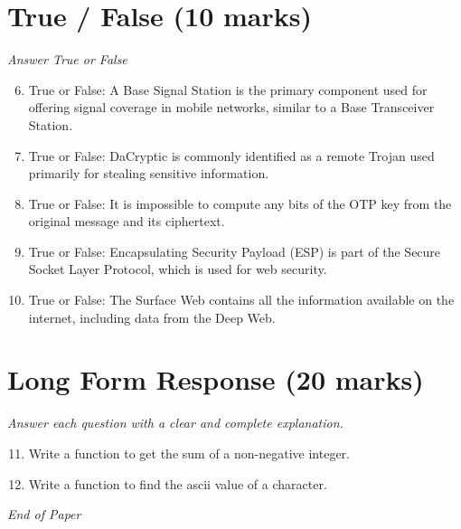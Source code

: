 \documentclass[12pt]{article}
\begin{document}
\section*{True / False (10 marks)}
\textit{Answer True or False}
\begin{enumerate}[label=\arabic*.]
\setcounter{enumi}{5}
\item True or False: A Base Signal Station is the primary component used for offering signal coverage in mobile networks, similar to a Base Transceiver Station.
\item True or False: DaCryptic is commonly identified as a remote Trojan used primarily for stealing sensitive information.
\item True or False: It is impossible to compute any bits of the OTP key from the original message and its ciphertext.
\item True or False: Encapsulating Security Payload (ESP) is part of the Secure Socket Layer Protocol, which is used for web security.
\item True or False: The Surface Web contains all the information available on the internet, including data from the Deep Web.
\end{enumerate}

\section*{Long Form Response (20 marks)}
\textit{Answer each question with a clear and complete explanation.}
\begin{enumerate}[label=\arabic*.]
\setcounter{enumi}{10}
\item Write a function to get the sum of a non-negative integer.
\item Write a function to find the ascii value of a character.
\end{enumerate}

\vfill
\noindent\textit{End of Paper}
\end{document}
